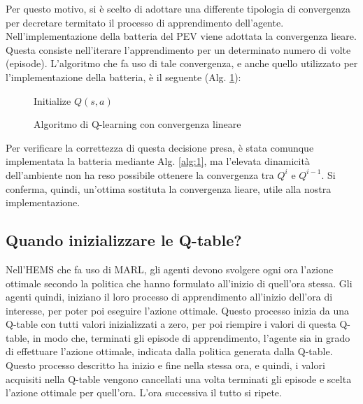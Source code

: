 \documentclass[italian, Lau, oneside]{sapthesis}
\begin{document}
Per questo motivo, si è scelto di adottare una differente tipologia di convergenza per decretare termitato il processo di apprendimento dell'agente. Nell'implementazione della batteria del PEV viene adottata la convergenza lieare. Questa consiste nell'iterare l'apprendimento per un determinato numero di volte (episode). L'algoritmo che fa uso di tale convergenza, e anche quello utilizzato per l'implementazione della batteria, è il seguente (Alg. \ref{alg:2}):

\begin{figure}[ht]
    \centering
    \begin{minipage}{\linewidth}
        \begin{algorithm}[H]
        \label{alg:2}
            \SetAlgoLined
            Initialize $Q(s,a)$\;
            \caption{Algoritmo di Q-learning con convergenza lineare}
        \end{algorithm}
    \end{minipage}
\end{figure}

Per verificare la correttezza di questa decisione presa, è stata comunque implementata la batteria mediante Alg. \ref{alg:1}, ma l'elevata dinamicità dell'ambiente non ha reso possibile ottenere la convergenza tra $Q^i$ e $Q^{i-1}$. Si conferma, quindi, un'ottima sostituta la convergenza lieare, utile alla nostra implementazione. 




\subsection{Quando inizializzare le Q-table?}
Nell'HEMS che fa uso di MARL, gli agenti devono svolgere ogni ora l'azione ottimale secondo la politica che hanno formulato all'inizio di quell'ora stessa. Gli agenti quindi, iniziano il loro processo di apprendimento all'inizio dell'ora di interesse, per poter poi eseguire l'azione ottimale. Questo processo inizia da una Q-table con tutti valori inizializzati a zero, per poi riempire i valori di questa Q-table, in modo che, terminati gli episode di apprendimento, l'agente sia in grado di effettuare l'azione ottimale, indicata dalla politica generata dalla Q-table. Questo processo descritto ha inizio e fine nella stessa ora, e quindi, i valori acquisiti nella Q-table vengono cancellati una volta terminati gli episode e scelta l'azione ottimale per quell'ora. L'ora successiva il tutto si ripete.
\end{document}
